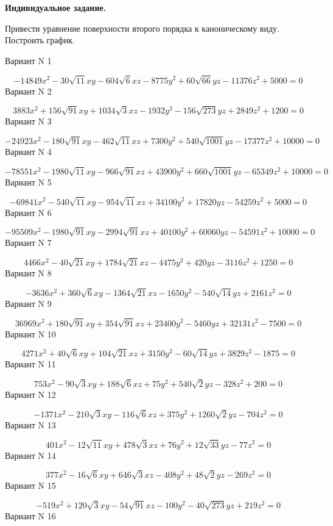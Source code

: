 \documentclass[11pt]{report}
\begin{document}
\pagestyle{empty}

{\bf Индивидуальное задание.}


Привести уравнение поверхности второго порядка к каноническому виду. Построить график.

Вариант N 1

$$- 14849 x^{2} - 30 \sqrt{11} x y - 604 \sqrt{6} x z - 8775 y^{2} + 60 \sqrt{66} y z - 11376 z^{2} + 5000 = 0$$Вариант N 2

$$3883 x^{2} + 156 \sqrt{91} x y + 1034 \sqrt{3} x z - 1932 y^{2} - 156 \sqrt{273} y z + 2849 z^{2} + 1200 = 0$$Вариант N 3

$$- 24923 x^{2} - 180 \sqrt{91} x y - 462 \sqrt{11} x z + 7300 y^{2} + 540 \sqrt{1001} y z - 17377 z^{2} + 10000 = 0$$Вариант N 4

$$- 78551 x^{2} - 1980 \sqrt{11} x y - 966 \sqrt{91} x z + 43900 y^{2} + 660 \sqrt{1001} y z - 65349 z^{2} + 10000 = 0$$Вариант N 5

$$- 69841 x^{2} - 540 \sqrt{11} x y - 954 \sqrt{11} x z + 34100 y^{2} + 17820 y z - 54259 z^{2} + 5000 = 0$$Вариант N 6

$$- 95509 x^{2} - 1980 \sqrt{91} x y - 2994 \sqrt{91} x z + 40100 y^{2} + 60060 y z - 54591 z^{2} + 10000 = 0$$Вариант N 7

$$4466 x^{2} - 40 \sqrt{21} x y + 1784 \sqrt{21} x z - 4475 y^{2} + 420 y z - 3116 z^{2} + 1250 = 0$$Вариант N 8

$$- 3636 x^{2} + 360 \sqrt{6} x y - 1364 \sqrt{21} x z - 1650 y^{2} - 540 \sqrt{14} y z + 2161 z^{2} = 0$$Вариант N 9

$$36969 x^{2} + 180 \sqrt{91} x y + 354 \sqrt{91} x z + 23400 y^{2} - 5460 y z + 32131 z^{2} - 7500 = 0$$Вариант N 10

$$4271 x^{2} + 40 \sqrt{6} x y + 104 \sqrt{21} x z + 3150 y^{2} - 60 \sqrt{14} y z + 3829 z^{2} - 1875 = 0$$Вариант N 11

$$753 x^{2} - 90 \sqrt{3} x y + 188 \sqrt{6} x z + 75 y^{2} + 540 \sqrt{2} y z - 328 z^{2} + 200 = 0$$Вариант N 12

$$- 1371 x^{2} - 210 \sqrt{3} x y - 116 \sqrt{6} x z + 375 y^{2} + 1260 \sqrt{2} y z - 704 z^{2} = 0$$Вариант N 13

$$401 x^{2} - 12 \sqrt{11} x y + 478 \sqrt{3} x z + 76 y^{2} + 12 \sqrt{33} y z - 77 z^{2} = 0$$Вариант N 14

$$377 x^{2} - 16 \sqrt{6} x y + 646 \sqrt{3} x z - 408 y^{2} + 48 \sqrt{2} y z - 269 z^{2} = 0$$Вариант N 15

$$- 519 x^{2} + 120 \sqrt{3} x y - 54 \sqrt{91} x z - 100 y^{2} - 40 \sqrt{273} y z + 219 z^{2} = 0$$Вариант N 16
\end{document}
